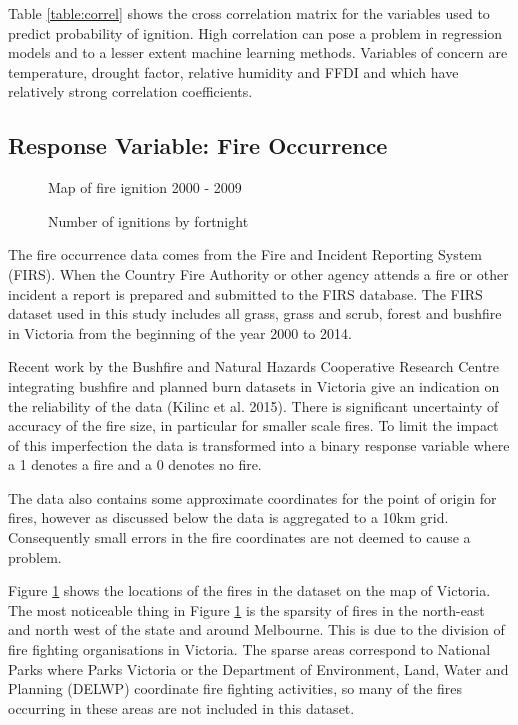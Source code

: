 \documentclass[11pt,a4paper]{article}
\begin{document}
Table \ref{table:correl} shows the cross correlation matrix for the variables used to predict probability of ignition. High correlation can pose a problem in regression models and to a lesser extent machine learning methods. Variables of concern are temperature, drought factor, relative humidity and FFDI and  which have relatively strong correlation coefficients. 

\subsection{Response Variable: Fire Occurrence}

\begin{figure}[!ht]
	\centering 
	\caption{Map of fire ignition 2000 - 2009} 
	\label{fig:firemap} 
\end{figure}

\begin{figure}[!ht]
	\centering 
	\caption{Number of ignitions by fortnight} 
	\label{fig:occ} 
\end{figure}

The fire occurrence data comes from the Fire and Incident Reporting System (FIRS). When the Country Fire Authority or other agency attends a fire or other incident a report is prepared and submitted to the FIRS database. The FIRS dataset used in this study includes all grass, grass and scrub, forest and bushfire in Victoria from the beginning of the year 2000 to 2014. 

Recent work by the Bushfire and Natural Hazards Cooperative Research Centre integrating bushfire and planned burn datasets in Victoria give an indication on the reliability of the data (Kilinc et al. 2015).  There is significant uncertainty of accuracy of the fire size, in particular for smaller scale fires. To limit the impact of this imperfection the data is transformed into a binary response variable where a 1 denotes a fire and a 0 denotes no fire. 

The data also contains some approximate coordinates for the point of origin for fires, however as discussed below the data is aggregated to a 10km grid. Consequently small errors in the fire coordinates are not deemed to cause a problem. 

Figure \ref{fig:firemap} shows the locations of the fires in the dataset on the map of Victoria. The most noticeable thing in Figure \ref{fig:firemap} is the sparsity of fires in the north-east and north west of the state and around Melbourne. This is due to the division of fire fighting organisations in Victoria. The sparse areas correspond to National Parks where Parks Victoria or the Department of Environment, Land, Water and Planning (DELWP) coordinate fire fighting activities, so many of the fires occurring in these areas are not included in this dataset. 
\end{document}
